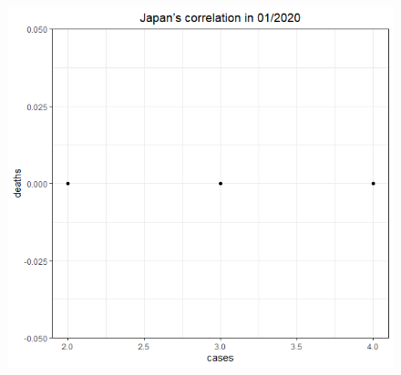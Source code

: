 \documentclass[a4paper]{article}
\theoremstyle{definition}
\begin{document}
\begin{enumerate}[1)]
\begin{figure}[H]
\begin{center}
        \includegraphics[scale = 0.3]{ix/ix.2/JPN_01_2020.png}
        

\end{center}
\end{figure}
\end{enumerate}
\end{document}
